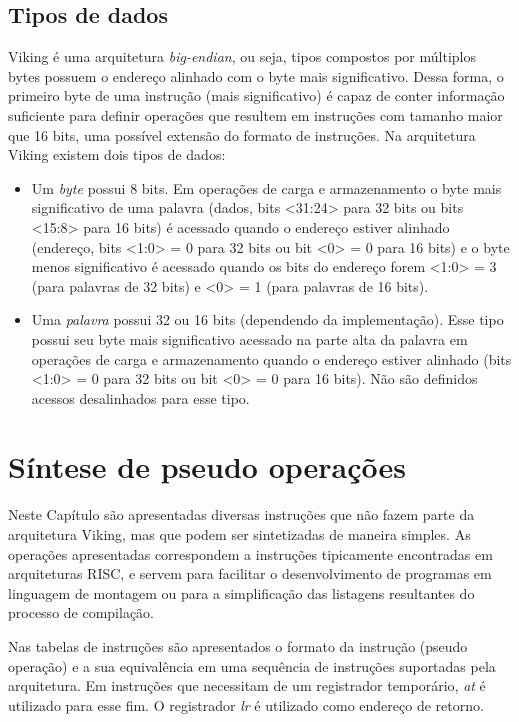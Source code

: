 \documentclass{extreport}
\begin{document}
\section{Tipos de dados}
\label{ref:data_types}
Viking é uma arquitetura \textit{big-endian}, ou seja, tipos compostos por múltiplos bytes possuem o endereço alinhado com o byte mais significativo. Dessa forma, o primeiro byte de uma instrução (mais significativo) é capaz de conter informação suficiente para definir operações que resultem em instruções com tamanho maior que 16 bits, uma possível extensão do formato de instruções. Na arquitetura Viking existem dois tipos de dados:

\begin{itemize}
\item Um \textit{byte} possui 8 bits. Em operações de carga e armazenamento o byte mais significativo de uma palavra (dados, bits <31:24> para 32 bits ou bits <15:8> para 16 bits) é acessado quando o endereço estiver alinhado (endereço, bits <1:0> = 0 para 32 bits ou bit <0> = 0 para 16 bits) e o byte menos significativo é acessado quando os bits do endereço forem <1:0> = 3 (para palavras de 32 bits) e <0> = 1 (para palavras de 16 bits).
\item Uma \textit{palavra} possui 32 ou 16 bits (dependendo da implementação). Esse tipo possui seu byte mais significativo acessado na parte alta da palavra em operações de carga e armazenamento quando o endereço estiver alinhado (bits <1:0> = 0 para 32 bits ou bit <0> = 0 para 16 bits). Não são definidos acessos desalinhados para esse tipo.
\end{itemize}

\chapter{Síntese de pseudo operações}
\label{ref:pseudo_ops}

Neste Capítulo são apresentadas diversas instruções que não fazem parte da arquitetura Viking, mas que podem ser sintetizadas de maneira simples. As operações apresentadas correspondem a instruções tipicamente encontradas em arquiteturas RISC, e servem para facilitar o desenvolvimento de programas em linguagem de montagem ou para a simplificação das listagens resultantes do processo de compilação.

Nas tabelas de instruções são apresentados o formato da instrução (pseudo operação) e a sua equivalência em uma sequência de instruções suportadas pela arquitetura. Em instruções que necessitam de um registrador temporário, \textit{at} é utilizado para esse fim. O registrador \textit{lr} é utilizado como endereço de retorno.
\end{document}
